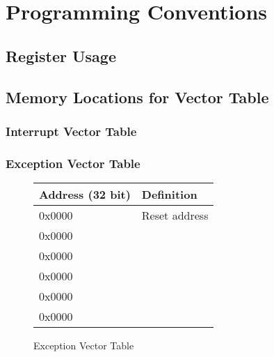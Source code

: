 \documentclass[letterpaper, 11pt]{article}
\begin{document}
\section{Programming Conventions}
\subsection{Register Usage}
\subsection{Memory Locations for Vector Table}
\subsubsection{Interrupt Vector Table}
\subsubsection{Exception Vector Table}


\begin{figure}[!h]
	\begin{center}
		\begin{tabular}{|l|l|}
			\hline
			Address (32 bit) &  Definition\\ \hline
			0x0000 & Reset address \\ 	\hline
			0x0000 &  \\ 	\hline
			0x0000 &  \\ 	\hline
			0x0000 &  \\ 	\hline
			0x0000 &  \\ 	\hline
			0x0000 &  \\	\hline
		\end{tabular} 
		\caption{Exception Vector Table}
	\end{center}
	
\end{figure}
\end{document}
